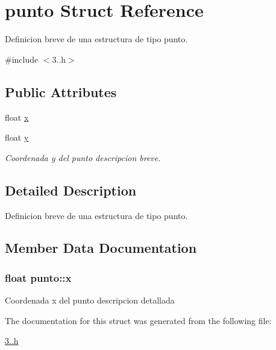 \hypertarget{structpunto}{}\section{punto Struct Reference}
\label{structpunto}


Definicion breve de una estructura de tipo punto.  




{\ttfamily \#include $<$3..\+h$>$}

\subsection*{Public Attributes}
\begin{DoxyCompactItemize}
\item 
float \hyperlink{structpunto_a88ea2198d614083f63658a0df6545157}{x}
\item 
float \hyperlink{structpunto_a2340778f38538d8782bff1e533e39870}{y}\hypertarget{structpunto_a2340778f38538d8782bff1e533e39870}{}\label{structpunto_a2340778f38538d8782bff1e533e39870}

\begin{DoxyCompactList}\small\item\em Coordenada y del punto descripcion breve. \end{DoxyCompactList}\end{DoxyCompactItemize}


\subsection{Detailed Description}
Definicion breve de una estructura de tipo punto. 

\subsection{Member Data Documentation}
\subsubsection[{\texorpdfstring{x}{x}}]{\setlength{\rightskip}{0pt plus 5cm}float punto\+::x}\hypertarget{structpunto_a88ea2198d614083f63658a0df6545157}{}\label{structpunto_a88ea2198d614083f63658a0df6545157}
Coordenada x del punto descripcion detallada 

The documentation for this struct was generated from the following file\+:\begin{DoxyCompactItemize}
\item 
\hyperlink{3_82_8h}{3..\+h}\end{DoxyCompactItemize}

